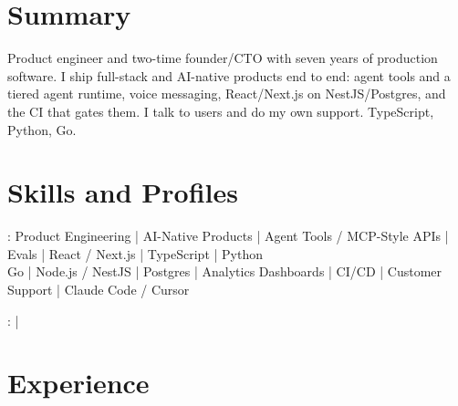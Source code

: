 \documentclass[print]{jack-resume}
\begin{document}
\pagecolor{darkmodeBackground}


\begin{minipage}[t][1cm][t]{.03\textwidth}
    \hfill
\end{minipage}

\section{Summary}
Product engineer and two-time founder/CTO with seven years of production software. I ship full-stack and AI-native products end to end: agent tools and a tiered agent runtime, voice messaging, React/Next.js on NestJS/Postgres, and the CI that gates them. I talk to users and do my own support. TypeScript, Python, Go.
\sectionsep

\section{Skills and Profiles}
:
Product Engineering \hfill | \hfill
AI-Native Products \hfill | \hfill
Agent Tools / MCP-Style APIs \hfill | \hfill
Evals \hfill | \hfill
React / Next.js \hfill | \hfill
TypeScript \hfill | \hfill
Python \\
\hspace{1.0cm} Go \hfill | \hfill
Node.js / NestJS \hfill | \hfill
Postgres \hfill | \hfill
Analytics Dashboards \hfill | \hfill
CI/CD \hfill | \hfill
Customer Support \hfill | \hfill
Claude Code / Cursor \\

\raggedright{
    :
      \href{https://www.linkedin.com/in/jack-sturtevant/}{ \ExternalLink} |
     \href{https://github.com/jacksturt}{ \ExternalLink}}

\section{Experience}
\end{document}
